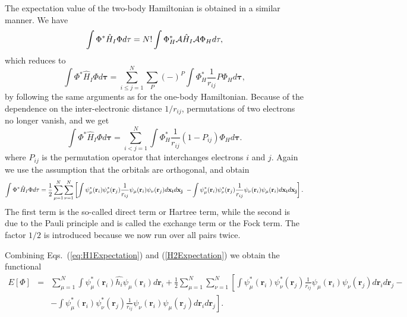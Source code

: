 The expectation value of the two-body Hamiltonian is obtained in a
similar manner. We have
\begin{equation}
  \int \Phi^*\hat{H}_I\Phi d\mathbf{\tau} 
  = N! \int \Phi_H^*{\cal A}\hat{H}_I{\cal A}\Phi_H d\mathbf{\tau},
\end{equation}
which reduces to
\begin{equation}
 \int \Phi^*\hat{H}_I\Phi d\mathbf{\tau} 
  = \sum_{i\le j=1}^N \sum_{P} (-)^P\int 
  \Phi_H^*\frac{1}{r_{ij}}P\Phi_H d\mathbf{\tau},
\end{equation}
by following the same arguments as for the one-body
Hamiltonian. Because of the dependence on the inter-electronic distance $1/r_{ij}$,  permutations of
two electrons no longer vanish, and we get
\begin{equation}
  \int \Phi^*\hat{H}_I\Phi d\mathbf{\tau} 
  = \sum_{i < j=1}^N \int  
  \Phi_H^*\frac{1}{r_{ij}}(1-P_{ij})\Phi_H d\mathbf{\tau}.
\end{equation}
where $P_{ij}$ is the permutation operator that interchanges
electrons $i$ and $j$. Again we use the assumption that the orbitals
are orthogonal, 
and obtain
\begin{equation}
  \int \Phi^*\hat{H}_I\Phi d\mathbf{\tau} 
  = \frac{1}{2}\sum_{\mu=1}^N\sum_{\nu=1}^N
    \left[ \int \psi_{\mu}^*(\mathbf{r}_i)\psi_{\nu}^*(\mathbf{r}_j)\frac{1} 
    {r_{ij}}\psi_{\mu}(\mathbf{r}_i)\psi_{\nu}(\mathbf{r}_j)
    d\mathbf{x_i}d\mathbf{x_j} \right.\\
  \left.
  - \int \psi_{\mu}^*(\mathbf{r}_i)\psi_{\nu}^*(\mathbf{r}_j)
  \frac{1}{r_{ij}}\psi_{\nu}(\mathbf{r}_i)\psi_{\mu}(\mathbf{r}_i)
  d\mathbf{x_i}d\mathbf{x_j}
  \right]. \label{H2Expectation}
\end{equation}
The first term is the so-called direct term or Hartree term, while the second is due to the Pauli principle and is called
the exchange term or the Fock term.
The factor  $1/2$ is introduced because we now run over
all pairs twice. 

Combining Eqs.~(\ref{eq:H1Expectation}) and
(\ref{H2Expectation}) we obtain the functional 
\begin{eqnarray}
  E[\Phi] &
  = &\sum_{\mu=1}^N \int \psi_{\mu}^*(\mathbf{r}_i)\hat{h_i}\psi_{\mu}(\mathbf{r}_i) d\mathbf{r}_i + 
  \frac{1}{2}\sum_{{\mu}=1}^N\sum_{{\nu}=1}^N \left[ \int
  \psi_{\mu}^*(\mathbf{r}_i)\psi_{\nu}^*(\mathbf{r}_j)\frac{1} 
  {r_{ij}}\psi_{\mu}(\mathbf{r}_i)\psi_{\nu}(\mathbf{r}_j) d\mathbf{r}_id\mathbf{r}_j-\right. \\ \nonumber 
  & &-\left. \int
  \psi_{\mu}^*(\mathbf{r}_i)\psi_{\nu}^*(\mathbf{r}_j)\frac{1}{r_{ij}}\psi_{\nu}(\mathbf{r}_i)\psi_{\mu}(\mathbf{r}_j)
  d\mathbf{r}_id\mathbf{r}_j \right]. 
\label{FunctionalEPhi}
\end{eqnarray}





